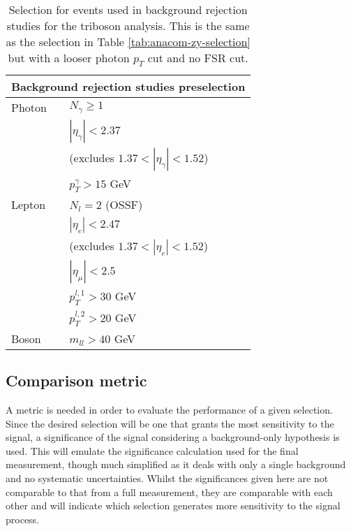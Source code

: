 \begin{table}
  \centering
  \renewcommand\arraystretch{1.3}
  \caption{
    Selection for events used in background rejection studies for the \VZy
    triboson analysis. This is the same as the \Zy selection in Table
    \ref{tab:anacom-zy-selection} but with a looser photon $p_T$ cut and no
    \acs{FSR} cut.
  }
  \begin{tabular}{p{6em}l}
    \hline\hline
    \multicolumn{2}{c}{Background rejection studies preselection} \\
    \hline
    Photon & $N_\gamma \geq 1$ \\
           & $|\eta_\gamma| < 2.37$ \\
           & (excludes $1.37 < |\eta_\gamma| < 1.52$) \\
           & $p_T^\gamma > 15$ GeV \\
    \hline
    Lepton & $N_l = 2$ (OSSF)\\
           & $|\eta_e| < 2.47$ \\
           & (excludes $1.37 < |\eta_e| < 1.52$) \\
           & $|\eta_\mu| < 2.5$ \\
           & $p_T^{l,1} > 30$ GeV \\
           & $p_T^{l,2} > 20$ GeV \\
    \hline
    Boson  & $m_{ll} > 40$ GeV \\
    \hline\hline
  \end{tabular}
  \label{tab:vzy-bdt-preliminaryselection}
\end{table}

\subsection{Comparison metric}
\label{sec:vzy-bdt-significance}

A metric is needed in order to evaluate the performance of a given selection.
Since the desired selection will be one that grants the most sensitivity to the
\VZy signal, a significance of the signal considering a background-only
hypothesis is used. This will emulate the significance calculation used for the
final measurement, though much simplified as it deals with only a single
background and no systematic uncertainties. Whilst the significances given here
are not comparable to that from a full measurement, they are comparable with
each other and will indicate which selection generates more sensitivity to the
signal process.

